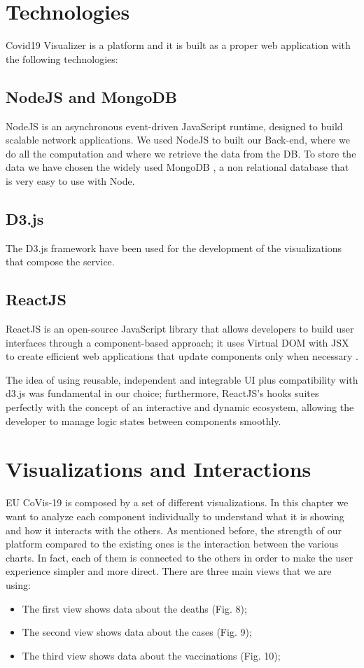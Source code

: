 \documentclass[10pt,conference]{IEEEtran}
\begin{document}
\section{Technologies}
Covid19 Visualizer is a platform and it is built as a proper web application with the following technologies:

\subsection{NodeJS and MongoDB}
NodeJS is an asynchronous event-driven JavaScript runtime, designed to build scalable network applications.
We used NodeJS \cite{node} to built our Back-end, where we do all the computation and where we retrieve the data from the DB. To store the data we have chosen the widely used
MongoDB \cite{mongo}, a non relational database that is very easy to use with Node.

\subsection{D3.js}
The D3.js framework \cite{d3} have been used for the development of the visualizations that compose the service.

\subsection{ReactJS}
ReactJS is an open-source JavaScript library that allows developers to build user interfaces through a component-based approach; it uses Virtual DOM with JSX to create efficient web applications that update components only when necessary \cite{react}.

The idea of using reusable, independent and integrable UI plus compatibility with d3.js was fundamental in our choice;
furthermore, ReactJS's hooks suites perfectly with the concept of an interactive and dynamic ecosystem, allowing the developer to manage logic states between components smoothly.


\section{Visualizations and Interactions}
EU CoVis-19 is composed by a set of different visualizations. In this chapter we want to analyze each component individually to understand what it
is showing and how it interacts with the others. As mentioned before, the strength of our platform compared to the existing ones is 
the interaction between the various charts. In fact, each of them is connected to the others in order to make the user experience 
simpler and more direct.
There are three main views that we are using:
\begin{itemize}
	\item The first view shows data about the deaths (Fig. 8);
	\item The second view shows data about the cases (Fig. 9);
	\item The third view shows data about the vaccinations (Fig. 10);
\end{itemize}
\end{document}

